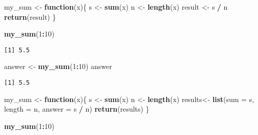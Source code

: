 \documentclass[12pt,letterpaperpaper,openany]{book}
\newenvironment{Shaded}{\begin{snugshade}}{\end{snugshade}}
\newcommand{\ControlFlowTok}[1]{\textcolor[rgb]{0.13,0.29,0.53}{\textbf{#1}}}
\newcommand{\DataTypeTok}[1]{\textcolor[rgb]{0.13,0.29,0.53}{#1}}
\newcommand{\DecValTok}[1]{\textcolor[rgb]{0.00,0.00,0.81}{#1}}
\newcommand{\KeywordTok}[1]{\textcolor[rgb]{0.13,0.29,0.53}{\textbf{#1}}}
\newcommand{\NormalTok}[1]{#1}
\newcommand{\OperatorTok}[1]{\textcolor[rgb]{0.81,0.36,0.00}{\textbf{#1}}}
\newcommand{\StringTok}[1]{\textcolor[rgb]{0.31,0.60,0.02}{#1}}
\begin{document}
\begin{Shaded}
\begin{Highlighting}[]
\NormalTok{my_sum <-}\StringTok{ }\ControlFlowTok{function}\NormalTok{(x)\{}
\NormalTok{  s <-}\StringTok{ }\KeywordTok{sum}\NormalTok{(x)}
\NormalTok{  n <-}\StringTok{ }\KeywordTok{length}\NormalTok{(x)}
\NormalTok{  result <-}\StringTok{ }\NormalTok{s }\OperatorTok{/}\StringTok{ }\NormalTok{n}
  \KeywordTok{return}\NormalTok{(result)}
\NormalTok{\}}
\end{Highlighting}
\end{Shaded}

\begin{Shaded}
\begin{Highlighting}[]
\KeywordTok{my_sum}\NormalTok{(}\DecValTok{1}\OperatorTok{:}\DecValTok{10}\NormalTok{)}
\end{Highlighting}
\end{Shaded}

\begin{verbatim}
[1] 5.5
\end{verbatim}

\begin{Shaded}
\begin{Highlighting}[]
\NormalTok{answer <-}\StringTok{ }\KeywordTok{my_sum}\NormalTok{(}\DecValTok{1}\OperatorTok{:}\DecValTok{10}\NormalTok{)}
\NormalTok{answer}
\end{Highlighting}
\end{Shaded}

\begin{verbatim}
[1] 5.5
\end{verbatim}

\begin{Shaded}
\begin{Highlighting}[]
\NormalTok{my_sum <-}\StringTok{ }\ControlFlowTok{function}\NormalTok{(x)\{}
\NormalTok{  s <-}\StringTok{ }\KeywordTok{sum}\NormalTok{(x)}
\NormalTok{  n <-}\StringTok{ }\KeywordTok{length}\NormalTok{(x)}
\NormalTok{  results<-}\StringTok{ }\KeywordTok{list}\NormalTok{(}\DataTypeTok{sum =}\NormalTok{ s, }\DataTypeTok{length =}\NormalTok{ n, }\DataTypeTok{answer =}\NormalTok{ s }\OperatorTok{/}\StringTok{ }\NormalTok{n)}
  \KeywordTok{return}\NormalTok{(results)}
\NormalTok{\}}
\end{Highlighting}
\end{Shaded}

\begin{Shaded}
\begin{Highlighting}[]
\KeywordTok{my_sum}\NormalTok{(}\DecValTok{1}\OperatorTok{:}\DecValTok{10}\NormalTok{) }
\end{Highlighting}
\end{Shaded}
\end{document}
